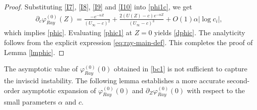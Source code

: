 \documentclass[reqno,11pt]{amsart}
\numberwithin{equation}{section}
\numberwithin{equation}{section}
\theoremstyle{plain}
\begin{document}
\begin{proof}
Substituting \eqref{I7}, \eqref{I8}, \eqref{I9} and \eqref{I10} into \eqref{phi1c}, we get
\begin{align}\label{phic1}
	\partial_c\varphi_{Ray}^{(0)}(Z)=\frac{-e^{-\alpha Z}}{(U_\infty-c)^2}+\frac{2(U(Z)-c)e^{-\alpha Z}}{(U_\infty-c)^3}+O(1)\alpha|\log c_i|,
\end{align}
which implies \eqref{phic}. Evaluating \eqref{phic1} at $Z=0$ yields \eqref{dphic}. The analyticity follows from the explicit expression \eqref{eq:ray-main-def}. This completes the proof of Lemma \ref{lmphic}.
\end{proof}



The asymptotic value of $\varphi^{(0)}_{Ray}(0)$ obtained in \eqref{bc1} is not sufficient to capture the inviscid instability. The following lemma establishes a more accurate second-order asymptotic expansion of $\varphi_{Ray}^{(0)}(0)$ and $\partial_Z\varphi_{Ray}^{(0)}(0)$ with respect to the small parameters $\alpha$ and $c$.
\end{document}
